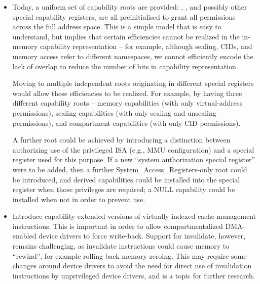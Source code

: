 \begin{itemize}
\item Today, a uniform set of capability roots are provided: \PCC{}, \DDC{},
  and possibly other special capability registers, are all
  preinitialised to grant all permissions across the full address space.
  This is a simple model that is easy to understand, but implies that certain
  efficiencies cannot be realized in the in-memory capability representation --
  for example, although sealing, CIDs, and memory access refer to different
  namespaces, we cannot efficiently encode
the
  lack of overlap to reduce the number of bits in capability representation.

  Moving to multiple independent roots originating in different special
  registers would allow these efficiencies to be realized.
  For example, by having three different capability roots -- memory
  capabilities (with only virtual-address permissions), sealing capabilities
  (with only sealing and unsealing permissions), and compartment capabilities
  (with only CID permissions).

  A further root could be achieved by introducing a distinction between \PCC{}
  authorizing use of the privileged ISA (e.g., MMU configuration) and a special
  register used for this purpose.
  If a new ``system authorization special register'' were to be added, then a
  further System\_Access\_Registers-only root could be introduced, and derived
  capabilities could be installed into the special register when those
  privileges are required; a NULL capability could be installed when not in
  order to prevent use.

\item Introduce capability-extended versions of virtually indexed
  cache-management instructions.
  This is important in order to allow compartmentalized DMA-enabled device
  drivers to force write-back.
  Support for invalidate, however, remains challenging, as invalidate
  instructions could cause memory to ``rewind'', for example rolling back
  memory zeroing.
  This may require some changes around device drivers to avoid the need for
  direct use of invalidation instructions by unprivileged device drivers, and
  is a topic for further research.
\end{itemize}

